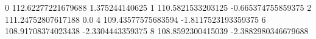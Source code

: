 0 112.62277221679688 1.375244140625
1 110.5821533203125 -0.665374755859375
2 111.24752807617188 0.0
4 109.43577575683594 -1.8117523193359375
6 108.91708374023438 -2.3304443359375
8 108.8592300415039 -2.3882980346679688
